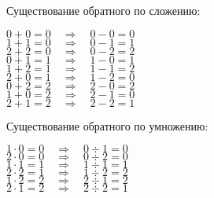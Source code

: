 \documentclass{article}
\begin{document}
	\newpage
	Существование обратного по сложению: \\
	\begin{center}
		$0 + 0 = 0 \quad \Rightarrow \quad 0 - 0 = 0$ \\
		$1 + 1 = 0 \quad \Rightarrow \quad 0 - 1 = 1$ \\
		$2 + 2 = 0 \quad \Rightarrow \quad 0 - 2 = 2$ \\
		$0 + 1 = 1 \quad \Rightarrow \quad 1 - 0 = 1$ \\
		$1 + 2 = 1 \quad \Rightarrow \quad 1 - 1 = 2$ \\
		$2 + 0 = 1 \quad \Rightarrow \quad 1 - 2 = 0$ \\
		$0 + 2 = 2 \quad \Rightarrow \quad 2 - 0 = 2$ \\
		$1 + 0 = 2 \quad \Rightarrow \quad 2 - 1 = 0$ \\
		$2 + 1 = 2 \quad \Rightarrow \quad 2 - 2 = 1$ \\
	\end{center}
	Существование обратного по умножению: \\
	\begin{center}
		$1 \cdot 0 = 0 \quad \Rightarrow \quad 0 \div 1 = 0$ \\
		$2 \cdot 0 = 0 \quad \Rightarrow \quad 0 \div 2 = 0$ \\
		$1 \cdot 1 = 1 \quad \Rightarrow \quad 1 \div 1 = 1$ \\
		$2 \cdot 2 = 1 \quad \Rightarrow \quad 1 \div 2 = 2$ \\
		$1 \cdot 2 = 2 \quad \Rightarrow \quad 2 \div 1 = 2$ \\
		$2 \cdot 1 = 2 \quad \Rightarrow \quad 2 \div 2 = 1$ \\
	\end{center}

	\vspace{10px}
\end{document}
